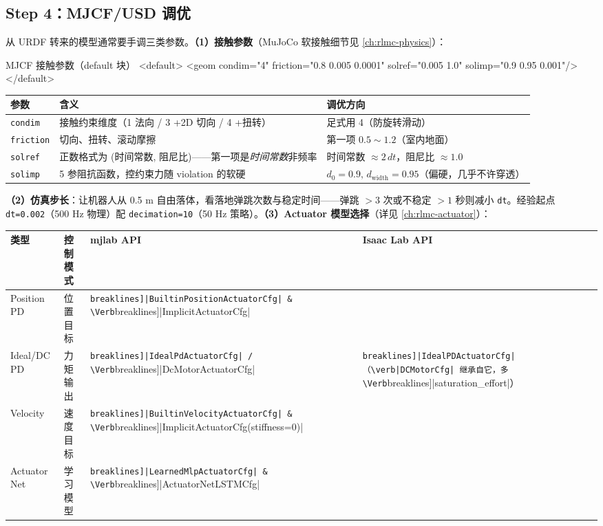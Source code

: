 \subsection{Step 4：MJCF/USD 调优}
\label{sec:rlmc-diy-pipe-tune}

从 URDF 转来的模型通常要手调三类参数。\textbf{（1）接触参数}（MuJoCo 软接触细节见 \cref{ch:rlmc-physics}）：

\begin{codebox}[text]{MJCF 接触参数（default 块）}
<default>
  <geom condim="4"
        friction="0.8 0.005 0.0001"
        solref="0.005 1.0"
        solimp="0.9 0.95 0.001"/>
</default>
\end{codebox}

\begin{center}
\small
\begin{tabular}{@{}lp{4.8cm}p{4.6cm}@{}}
\toprule
参数 & 含义 & 调优方向 \\
\midrule
\verb|condim| & 接触约束维度（1 法向 / 3 +2D 切向 / 4 +扭转） & 足式用 4（防旋转滑动） \\
\verb|friction| & 切向、扭转、滚动摩擦 & 第一项 $0.5\sim 1.2$（室内地面） \\
\verb|solref| & 正数格式为 (时间常数, 阻尼比)——第一项是\emph{时间常数}非频率 & 时间常数 $\approx 2\,dt$，阻尼比 $\approx 1.0$ \\
\verb|solimp| & 5 参阻抗函数，控约束力随 violation 的软硬 & $d_0{=}0.9,\,d_{\text{width}}{=}0.95$（偏硬，几乎不许穿透） \\
\bottomrule
\end{tabular}
\end{center}

\textbf{（2）仿真步长}：让机器人从 0.5 m 自由落体，看落地弹跳次数与稳定时间——弹跳 $>3$ 次或不稳定 $>1$ 秒则减小 \verb|dt|。经验起点 \verb|dt=0.002|（500 Hz 物理）配 \verb|decimation=10|（50 Hz 策略）。\textbf{（3）Actuator 模型选择}（详见 \cref{ch:rlmc-actuator}）：

\begin{center}
\small
\begin{tabular}{@{}lp{2.4cm}p{3.0cm}p{4.2cm}@{}}
\toprule
类型 & 控制模式 & mjlab API & Isaac Lab API \\
\midrule
Position PD & 位置目标 & \Verb[breaklines]|BuiltinPositionActuatorCfg| & \Verb[breaklines]|ImplicitActuatorCfg| \\
Ideal/DC PD & 力矩输出 & \Verb[breaklines]|IdealPdActuatorCfg| / \Verb[breaklines]|DcMotorActuatorCfg| & \Verb[breaklines]|IdealPDActuatorCfg|（\verb|DCMotorCfg| 继承自它，多 \Verb[breaklines]|saturation_effort|） \\
Velocity & 速度目标 & \Verb[breaklines]|BuiltinVelocityActuatorCfg| & \Verb[breaklines]|ImplicitActuatorCfg(stiffness=0)| \\
Actuator Net & 学习模型 & \Verb[breaklines]|LearnedMlpActuatorCfg| & \Verb[breaklines]|ActuatorNetLSTMCfg| \\
\bottomrule
\end{tabular}
\end{center}

